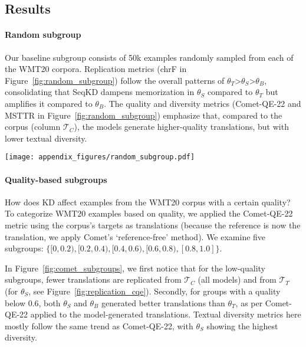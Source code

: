\subsection{Results}

\paragraph{Random subgroup} Our baseline subgroup consists of 50k examples randomly sampled from each of the WMT20 corpora.
Replication metrics (chrF in Figure~\ref{fig:random_subgroup}) follow the overall patterns of $\theta_T$>$\theta_S$>$\theta_B$, consolidating that SeqKD dampens memorization in $\theta_S$ compared to $\theta_T$ but amplifies it compared to $\theta_B$.
The quality and diversity metrics (Comet-QE-22 and MSTTR in Figure~\ref{fig:random_subgroup}) emphasize that, compared to the corpus (column $\mathcal{T}_C$), the models generate higher-quality translations, but with lower textual diversity.

\vspace{0.3cm}

\noindent\begin{minipage}{\textwidth}
    \centering
    \texttt{[image: appendix\_figures/random\_subgroup.pdf]}
    \label{fig:random_subgroup}
\end{minipage} 
\vspace{0.3cm}

\paragraph{Quality-based subgroups} How does KD affect examples from the WMT20 corpus with a certain quality? To categorize WMT20 examples based on quality, we applied the Comet-QE-22 metric using the corpus's targets as translations (because the reference is now the translation, we apply Comet's `reference-free' method).
We examine five subgroups: $\{[0, 0.2), [0.2, 0.4), [0.4, 0.6), [0.6,0.8), [0.8, 1.0]\}$.

In Figure~\ref{fig:comet_subgroups}, we first notice that for the low-quality subgroups, fewer translations are replicated from $\mathcal{T}_C$ (all models) and from $\mathcal{T}_T$ (for $\theta_S$, see Figure~\ref{fig:replication_cqe}).
Secondly, for groups with a quality below 0.6, both $\theta_S$ and $\theta_B$ generated better translations than $\theta_T$, as per Comet-QE-22 applied to the model-generated translations. 
Textual diversity metrics here mostly follow the same trend as Comet-QE-22, with $\theta_S$ showing the highest diversity.

